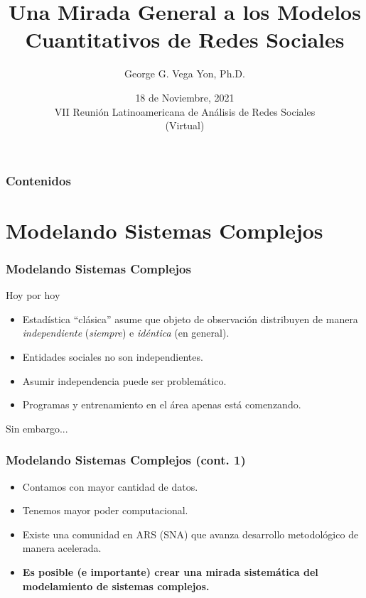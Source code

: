 \documentclass[handout]{beamer}
\title{Una Mirada General a los Modelos Cuantitativos de Redes Sociales}
\author{George G. Vega Yon, Ph.D.}
\date{18 de Noviembre, 2021\\VII Reunión Latinoamericana de Análisis de Redes Sociales\\(Virtual)}
\institute[UofU Epi]{University of Utah\\Division of Epidemiology}
\begin{document}
\frame{\maketitle}

\begin{frame}
	\frametitle{Contenidos}
\tableofcontents
\end{frame}


\section{Modelando Sistemas Complejos}

\begin{frame}
	\frametitle{Modelando Sistemas Complejos}
	Hoy por hoy
	\pause
	\begin{itemize}
		\item Estadística ``clásica'' asume que objeto de observación distribuyen de manera \textit{independiente} (\textit{siempre}) e \textit{idéntica}\pause{} (en general).\pause
		\item Entidades sociales no son independientes.\pause
		\item Asumir independencia puede ser problemático.\pause
		\item Programas y entrenamiento en el área apenas está comenzando.
	\end{itemize}\pause
	\vfill\hfill Sin embargo...\pause
	\end{frame}

\begin{frame}
	\frametitle{Modelando Sistemas Complejos (cont. 1)}
	\begin{itemize}
		\item Contamos con mayor cantidad de datos.\pause
		\item Tenemos mayor poder computacional.\pause
		\item Existe una comunidad en ARS (SNA) que avanza desarrollo metodológico de manera acelerada.\pause
		\item \textbf{Es posible (e importante) crear una mirada sistemática del modelamiento de sistemas complejos.}
\end{itemize}

\end{frame}
\end{document}

